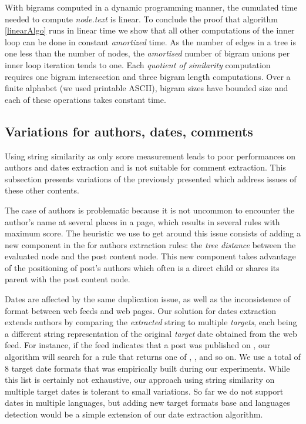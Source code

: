 \linearAlgo

With bigrams computed in a dynamic programming manner, the cumulated time needed to compute \code{(}\emph{node.text}\code{)} is linear. To conclude the proof that algorithm \ref{linearAlgo} runs in linear time we show that all other computations of the inner loop can be done in constant \emph{amortized} time. As the number of edges in a tree is one less than the number of nodes, the \emph{amortised} number of bigram unions per inner loop iteration tends to one. Each \emph{quotient of similarity} computation requires one bigram intersection and three bigram length computations. Over a finite alphabet (we used printable ASCII), bigram sizes have bounded size and each of these operations takes constant time.


\subsection{Variations for authors, dates, comments}
\label{variationsforauthorsdatesandcomments}

Using string similarity as only score measurement leads to poor performances on authors and dates extraction and is not suitable for comment extraction. This subsection presents variations of the previously presented  which address issues of these other contents.

The case of authors is problematic because it is not uncommon to encounter the author's name at several places in a page, which results in several rules with maximum  score. The heuristic we use to get around this issue consists of adding a new component in the  for authors extraction rules: the \emph{tree distance} between the evaluated node and the post content node. This new component takes advantage of the positioning of post's authors which often is a direct child or shares its parent with the post content node.

Dates are affected by the same duplication issue, as well as the inconsistence of format between web feeds and web pages. Our solution for dates extraction extends authors  by comparing the \emph{extracted} string to multiple \emph{targets}, each being a different string representation of the original \emph{target} date obtained from the web feed. For instance, if the feed indicates that a post was published on , our algorithm will search for a rule that returns one of , ,  and so on. We use a total of 8 target date formats that was empirically built during our experiments. While this list is certainly not exhaustive, our approach using string similarity on multiple target dates is tolerant to small variations. So far we do not support dates in multiple languages, but adding new target formats base and languages detection would be a simple extension of our date extraction algorithm.

